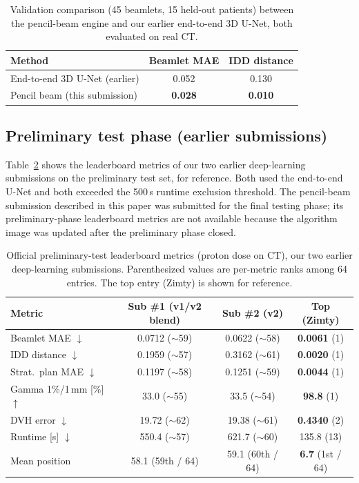 \documentclass[runningheads]{llncs}
\begin{document}
\begin{table}[t]
\centering
\caption{Validation comparison (45 beamlets, 15 held-out patients) between the pencil-beam engine and our earlier end-to-end 3D U-Net, both evaluated on real CT.}
\label{tab:val}
\begin{tabular}{lcc}
\toprule
Method & Beamlet MAE & IDD distance\\
\midrule
End-to-end 3D U-Net (earlier) & 0.052 & 0.130\\
Pencil beam (this submission) & \textbf{0.028} & \textbf{0.010}\\
\bottomrule
\end{tabular}
\end{table}

\subsection{Preliminary test phase (earlier submissions)}
Table~\ref{tab:lb} shows the leaderboard metrics of our two earlier deep-learning submissions on the preliminary test set, for reference. Both used the end-to-end U-Net and both exceeded the 500\,s runtime exclusion threshold. The pencil-beam submission described in this paper was submitted for the final testing phase; its preliminary-phase leaderboard metrics are not available because the algorithm image was updated after the preliminary phase closed.

\begin{table}[t]
\centering
\caption{Official preliminary-test leaderboard metrics (proton dose on CT), our two earlier deep-learning submissions. Parenthesized values are per-metric ranks among 64 entries. The top entry (Zimty) is shown for reference.}
\label{tab:lb}
\setlength{\tabcolsep}{3pt}
\begin{tabular}{lccc}
\toprule
Metric & Sub \#1 (v1/v2 blend) & Sub \#2 (v2) & Top (Zimty)\\
\midrule
Beamlet MAE $\downarrow$ & 0.0712 ($\sim$59) & 0.0622 ($\sim$58) & \textbf{0.0061} (1)\\
IDD distance $\downarrow$ & 0.1959 ($\sim$57) & 0.3162 ($\sim$61) & \textbf{0.0020} (1)\\
Strat.\ plan MAE $\downarrow$ & 0.1197 ($\sim$58) & 0.1251 ($\sim$59) & \textbf{0.0044} (1)\\
Gamma 1\%/1\,mm [\%] $\uparrow$ & 33.0 ($\sim$55) & 33.5 ($\sim$54) & \textbf{98.8} (1)\\
DVH error $\downarrow$ & 19.72 ($\sim$62) & 19.38 ($\sim$61) & \textbf{0.4340} (2)\\
Runtime [s] $\downarrow$ & 550.4 ($\sim$57) & 621.7 ($\sim$60) & 135.8 (13)\\
\midrule
Mean position & 58.1 (59th / 64) & 59.1 (60th / 64) & \textbf{6.7} (1st / 64)\\
\bottomrule
\end{tabular}
\end{table}
\end{document}
